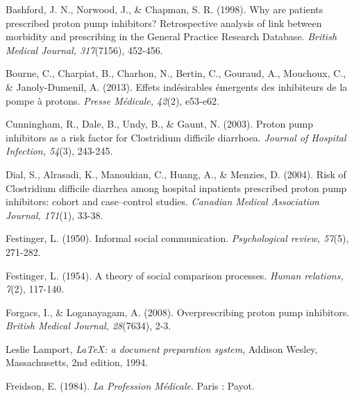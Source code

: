 

\label{Biblio} %

\begin{thebibliography}{9}

 Bashford, J. N., Norwood, J., \& Chapman, S. R. (1998). Why are patients prescribed proton pump inhibitors? Retrospective analysis of link between morbidity and prescribing in the General Practice Research Database. \textit{British Medical Journal, 317}(7156), 452-456. 
  
 Bourne, C., Charpiat, B., Charhon, N., Bertin, C., Gouraud, A., Mouchoux, C., \& Janoly-Dumenil, A. (2013). Effets indésirables émergents des inhibiteurs de la pompe à protons. \textit{ Presse Médicale, 42}(2), e53-e62. 
  
  Cunningham, R., Dale, B., Undy, B., \& Gaunt, N. (2003). Proton pump inhibitors as a risk factor for Clostridium difficile diarrhoea. \textit{Journal of Hospital Infection, 54}(3), 243-245. 
  
  Dial, S., Alrasadi, K., Manoukian, C., Huang, A., \& Menzies, D. (2004). Risk of Clostridium difficile diarrhea among hospital inpatients prescribed proton pump inhibitors: cohort and case–control studies. \textit{Canadian Medical Association Journal, 171}(1), 33-38. 
  
  Festinger, L. (1950). Informal social communication. \textit{Psychological review, 57}(5), 271-282. 
  
  Festinger, L. (1954). A theory of social comparison processes. \textit{Human relations, 7}(2), 117-140. 
  
 Forgacs, I., \& Loganayagam, A. (2008). Overprescribing proton pump inhibitors. \textit{British Medical Journal, 28}(7634), 2-3. 
  
  Leslie Lamport,
  \textit{\LaTeX: a document preparation system},
  Addison Wesley, Massachusetts,
  2nd edition,
  1994.
  
 Freidson, E. (1984). \textit{La Profession Médicale}. Paris : Payot. 
  

\end{thebibliography}
